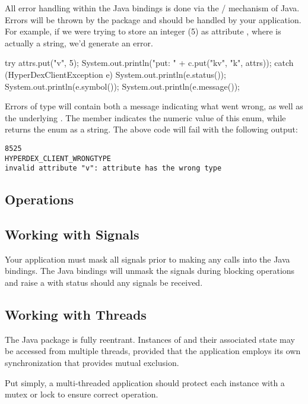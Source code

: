 All error handling within the Java bindings is done via the
/ mechanism of Java.  Errors will be thrown by the package
and should be handled by your application.  For example, if we were trying to
store an integer (5) as attribute , where  is actually a
string, we'd generate an error.

\begin{javacode}
try
{
    attrs.put("v", 5);
    System.out.println("put: " + c.put("kv", "k", attrs));
}
catch (HyperDexClientException e)
{
    System.out.println(e.status());
    System.out.println(e.symbol());
    System.out.println(e.message());
}
\end{javacode}

Errors of type  will contain both a message
indicating what went wrong, as well as the underlying .  The member  indicates the numeric
value of this enum, while  returns the enum as a string.  The above
code will fail with the following output:

\begin{verbatim}
8525
HYPERDEX_CLIENT_WRONGTYPE
invalid attribute "v": attribute has the wrong type
\end{verbatim}

\subsection{Operations}
\label{sec:api:java:ops}



\subsection{Working with Signals}
\label{sec:api:java:signals}

Your application must mask all signals prior to making any calls into the
Java bindings.  The Java bindings will unmask the signals during blocking
operations and raise a  with status
 should any signals be received.

\subsection{Working with Threads}
\label{sec:api:Java:threads}

The Java package is fully reentrant.  Instances of
 and their associated state may be accessed from
multiple threads, provided that the application employs its own synchronization
that provides mutual exclusion.

Put simply, a multi-threaded application should protect each 
instance with a mutex or lock to ensure correct operation.
